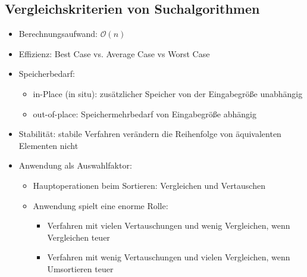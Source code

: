 \documentclass[
    12pt,
    a4paper,
    ngerman,
    color=3b,%
    marginpar=false,
    colorback=false,
    leqno,
]{tudaexercise}
\begin{document}
\subsection{Vergleichskriterien von Suchalgorithmen}\label{Vergleichskriterien von Suchalgorithmen}
\begin{itemize}
    \item Berechnungsaufwand: $\mathcal{O}(n)$
    \item Effizienz: Best Case vs. Average Case vs Worst Case
    \item Speicherbedarf:\begin{itemize}
              \item in-Place (in situ): zusätzlicher Speicher von der Eingabegröße unabhängig
              \item out-of-place: Speichermehrbedarf von Eingabegröße abhängig
          \end{itemize}
    \item Stabilität: stabile Verfahren verändern die Reihenfolge von äquivalenten Elementen nicht
    \item Anwendung als Auswahlfaktor:\begin{itemize}
              \item Hauptoperationen beim Sortieren: Vergleichen und Vertauschen
              \item Anwendung spielt eine enorme Rolle:\begin{itemize}
                        \item Verfahren mit vielen Vertauschungen und wenig Vergleichen, wenn Vergleichen teuer
                        \item Verfahren mit wenig Vertauschungen und vielen Vergleichen, wenn Umsortieren teuer
                    \end{itemize}
          \end{itemize}
\end{itemize}
\end{document}
